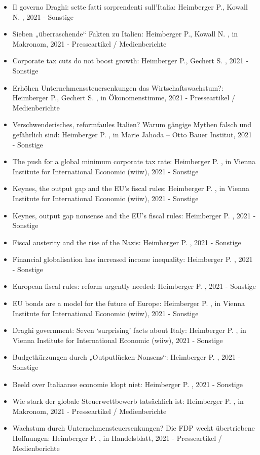 \begin{itemize}
	 \item Il governo Draghi: sette fatti sorprendenti sull’Italia: Heimberger P., Kowall N. , 2021 - Sonstige
	 \item Sieben „überraschende“ Fakten zu Italien: Heimberger P., Kowall N. , in Makronom, 2021 - Presseartikel / Medienberichte
	 \item Corporate tax cuts do not boost growth: Heimberger P., Gechert S. , 2021 - Sonstige
	 \item Erhöhen Unternehmenssteuersenkungen das Wirtschaftswachstum?: Heimberger P., Gechert S. , in Ökonomenstimme, 2021 - Presseartikel / Medienberichte
	 \item Verschwenderisches, reformfaules Italien? Warum gängige Mythen falsch und gefährlich sind: Heimberger P. , in Marie Jahoda – Otto Bauer Institut, 2021 - Sonstige
	 \item The push for a global minimum corporate tax rate: Heimberger P. , in Vienna Institute for International Economic (wiiw), 2021 - Sonstige
	 \item Keynes, the output gap and the EU’s fiscal rules: Heimberger P. , in Vienna Institute for International Economic (wiiw), 2021 - Sonstige
	 \item Keynes, output gap nonsense and the EU’s fiscal rules: Heimberger P. , 2021 - Sonstige
	 \item Fiscal austerity and the rise of the Nazis: Heimberger P. , 2021 - Sonstige
	 \item Financial globalisation has increased income inequality: Heimberger P. , 2021 - Sonstige
	 \item European fiscal rules: reform urgently needed: Heimberger P. , 2021 - Sonstige
	 \item EU bonds are a model for the future of Europe: Heimberger P. , in Vienna Institute for International Economic (wiiw), 2021 - Sonstige
	 \item Draghi government: Seven ‘surprising’ facts about Italy: Heimberger P. , in Vienna Institute for International Economic (wiiw), 2021 - Sonstige
	 \item Budgetkürzungen durch „Outputlücken-Nonsens“: Heimberger P. , 2021 - Sonstige
	 \item Beeld over Italiaanse economie klopt niet: Heimberger P. , 2021 - Sonstige
	 \item Wie stark der globale Steuerwettbewerb tatsächlich ist: Heimberger P. , in Makronom, 2021 - Presseartikel / Medienberichte
	 \item Wachstum durch Unternehmensteuersenkungen? Die FDP weckt übertriebene Hoffnungen: Heimberger P. , in Handelsblatt, 2021 - Presseartikel / Medienberichte

\end{itemize}
